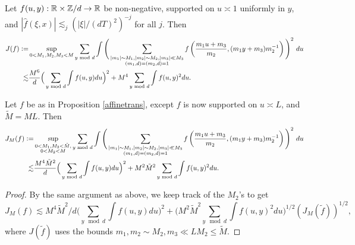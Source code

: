 \begin{proposition}
    Let $f(u,y):\mathbb{R}\times \mathbb{Z}/d \to \mathbb{R}$ be non-negative, supported on $u\asymp 1$ uniformly in $y$, and $|\hat{f}(\xi,x)|\lesssim_j (|\xi|/(dT)^2)^{-j}$ for all $j$. Then \begin{align*}
        J(f)\mathrel{\mathop:}= &\sup_{0<M_1,M_2,M_3<M}\sum_{y \textrm{ mod } d} \int\Bigg( \sum_{\substack{|m_1|\sim M_1,|m_2|\sim M_2 , |m_3|\ll M_3\\ (m_1,d)=(m_2,d)=1}} f\left(\frac{m_1 u+m_3}{m_2},(m_1 y+m_3)m_2^{-1}\right)\Bigg)^2 \ du\\
        \lesssim&\frac{M^6}{d}\Big(\sum_{y \textrm{ mod } d } \int f(u,y) du\Big)^2+{M^4}\sum_{y\textrm{ mod } d} \int f(u,y)^2 du.
    \end{align*}
\end{proposition}

\begin{corollary}\label{cor: affine}
    Let $f$ be as in Proposition \ref{affinetrans}, except $f$ is now supported on $u \asymp L$, and $\tilde{M}={ML}$. Then \begin{align*}
        J_{M}(f)\mathrel{\mathop:}= &\sup_{\substack{0<M_1,M_3<\tilde{M}, \\ 0< M_2<{M}}}\sum_{y \textrm{ mod } d} \int\Bigg( \sum_{\substack{|m_1|\sim M_1,|m_2|\sim M_2 , |m_3|\ll M_3\\ (m_1,d)=(m_2,d)=1}} f\left(\frac{m_1 u+m_3}{m_2},(m_1 y+m_3)m_2^{-1}\right)\Bigg)^2 \ du\\
        \lesssim&\frac{M^4\tilde{M}^2}{d}\Big(\sum_{y \textrm{ mod } d } \int f(u,y) du\Big)^2  + {M}^2\tilde{M}^2\sum_{y\textrm{ mod } d} \int f(u,y)^2 du.
    \end{align*}
\end{corollary}
\begin{proof}
    By the same argument as above, we keep track of the $M_2$'s to get 
    \[
        J_{{M}}(f) \lesssim M^4\tilde{M}^2/d \Big(\sum_{y \mod d } \int f(u,y) du\Big)^2 + \Big(M^2\tilde{M}^2\sum_{y\mod d} \int f(u,y)^2 du\Big)^{1/2}(J_{M}(\tilde{f}))^{1/2},
    \] where $J(\tilde{f})$ uses the bounds $m_1,m_2\sim M_2, m_3 \ll LM_2\leq \tilde{M}$.
\end{proof}

